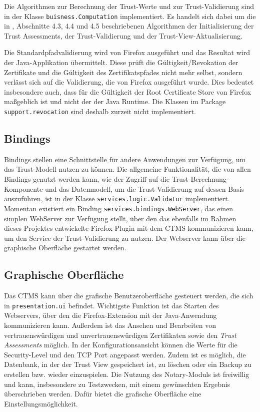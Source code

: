 \documentclass[accentcolor=tud1c,article,colorback,11pt]{tudreport}
\begin{document}
Die Algorithmen zur Berechnung der Trust-Werte und zur Trust-Validierung sind in der Klasse \texttt{buisness.Computation} implementiert. Es handelt sich dabei um die in \cite{braun2013trust}, Abschnitte 4.3, 4.4 und 4.5 beschriebenen Algorithmen der Initialisierung der Trust Assessments, der Trust-Validierung und der Trust-View-Aktualisierung.

Die Standardpfadvalidierung wird von Firefox ausgeführt und das Resultat wird der Java-Applikation übermittelt. Diese prüft die Gültigkeit/Revokation der Zertifikate und die Gültigkeit des Zertifikatspfades nicht mehr selbst, sondern verlässt sich auf die Validierung, die von Firefox ausgeführt wurde. Dies bedeutet insbesondere auch, dass für die Gültigkeit der Root Certificate Store von Firefox maßgeblich ist und nicht der der Java Runtime. Die Klassen im Package \texttt{support.revocation} sind deshalb zurzeit nicht implementiert.

\subsection{Bindings}
Bindings stellen eine Schnittstelle für andere Anwendungen zur Verfügung, um das Trust-Modell nutzen zu können. Die allgemeine Funktionalität, die von allen Bindings genutzt werden kann, wie der Zugriff auf die Trust-Berechnung-Komponente und das Datenmodell, um die Trust-Validierung auf dessen Basis auszuführen, ist in der Klasse \texttt{services.logic.Validator} implementiert. Momentan existiert ein Binding \texttt{services.bindings.WebServer}, das einen simplen WebServer zur Verfügung stellt, über den das ebenfalls im Rahmen dieses Projektes entwickelte Firefox-Plugin mit dem CTMS kommunizieren kann, um den Service der Trust-Validierung zu nutzen. Der Webserver kann über die graphische Oberfläche gestartet werden.

\subsection{Graphische Oberfläche}
Das CTMS kann über die grafische Benutzeroberfläche gesteuert werden, die sich in \texttt{presentation.ui} befindet. Wichtigste Funktion ist das Starten des Webservers, über den die Firefox-Extension mit der Java-Anwendung kommunizieren kann. Außerdem ist das Ansehen und Bearbeiten von vertrauenswürdigen und unvertrauenswürdigen Zertifikaten sowie den \textit{Trust Assessments} möglich. In der Konfigurationsansicht können die Werte für die Security-Level und den TCP Port angepasst werden. Zudem ist es möglich, die Datenbank, in der der Trust View gespeichert ist, zu löschen oder ein Backup zu erstellen bzw. wieder einzuspielen. Die Nutzung des Notary-Moduls ist freiwillig und kann, insbesondere zu Testzwecken, mit einem gewünschten Ergebnis überschrieben werden. Dafür bietet die grafische Oberfläche eine Einstellungsmöglichkeit.
\end{document}
